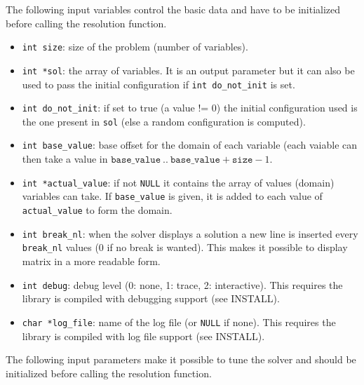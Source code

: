 \documentclass{article}
\begin{document}
The following input variables control the basic data and have to be
initialized before calling the resolution function.

\begin{itemize}

\item \texttt{int size}: size of the problem (number of variables).

\item \texttt{int *sol}: the array of variables. It is an output parameter
  but it can also be used to pass the initial configuration if \texttt{int
    do\_not\_init} is set.

\item \texttt{int do\_not\_init}: if set to true (a value != 0) the initial
 configuration used is the one present in \texttt{sol} (else a random configuration
 is computed).

\item \texttt{int base\_value}: base offset for the domain of each variable
 (each vaiable can then take a value in
 $\texttt{base\_value}~..~\texttt{base\_value} + \texttt{size}-1$. 

\item \texttt{int *actual\_value}: if not \texttt{NULL} it contains the array
  of values (domain) variables can take. If \texttt{base\_value} is given, it
  is added to each value of \texttt{actual\_value} to form the domain.

\item \texttt{int break\_nl}: when the solver displays a solution a new
 line is inserted every \texttt{break\_nl} values (0 if no break is
 wanted). This makes it possible to display matrix in a more readable form.

\item \texttt{int debug}: debug level (0: none, 1: trace, 2: interactive).
 This requires the library is compiled with debugging support (see INSTALL).

\item \texttt{char *log\_file}: name of the log file (or \texttt{NULL}
 if none).  This requires the library is compiled with log file support (see
 INSTALL).

\end{itemize}

The following input parameters make it possible to tune the solver and should
be initialized before calling the resolution function.
\end{document}
